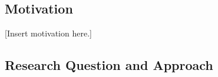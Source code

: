 %
%
%
%

\subsection{Motivation}
\label{sec:intro_motivation}


[Insert motivation here.]

\subsection{Research Question and Approach}
\label{sec:intro_question}

